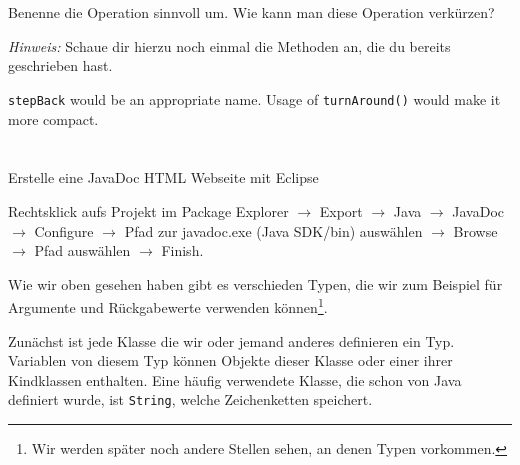 \begin{questions}
\begin{parts}
    \part{}
    Benenne die Operation sinnvoll um. Wie kann man diese Operation verkürzen?

    \emph{Hinweis:} Schaue dir hierzu noch einmal die Methoden an, die du bereits geschrieben hast.
    \begin{solution}
        \texttt{stepBack} would be an appropriate name.
        Usage of \texttt{turnAround()} would make it more compact.
    \end{solution}
    \part{}
    Erstelle eine JavaDoc HTML Webseite mit Eclipse
    \begin{solution}
        Rechtsklick aufs Projekt im Package Explorer \(\rightarrow\) Export \(\rightarrow\) Java \(\rightarrow\) JavaDoc \(\rightarrow\) Configure \(\rightarrow\) Pfad  zur javadoc.exe (Java SDK/bin) auswählen \(\rightarrow\) Browse \(\rightarrow\) Pfad  auswählen \(\rightarrow\) Finish.
    \end{solution}
    \end{parts}

    \renewcommand{\workingtimeMinutes}{TODO}
    Wie wir oben gesehen haben gibt es verschieden Typen, die wir zum Beispiel für Argumente und Rückgabewerte verwenden können\footnote{Wir werden später noch andere Stellen sehen, an denen Typen vorkommen.}.

    Zunächst ist jede Klasse die wir oder jemand anderes definieren ein Typ. Variablen von diesem Typ können Objekte dieser Klasse oder einer ihrer Kindklassen enthalten. Eine häufig verwendete Klasse, die schon von Java definiert wurde, ist \lstinline{String}, welche Zeichenketten speichert.


\end{questions}
